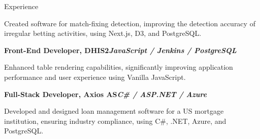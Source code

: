 \begin{rubric}{Experience}
\begin{compactitem}
\item Created software for match-fixing detection, improving the detection accuracy of irregular betting activities, using Next.js, D3, and PostgreSQL.
\vspace{-12pt}
\end{compactitem}
%
\entry*[2017 -- 2018]%
\textbf{Front-End Developer, DHIS2\hfill\textit{JavaScript / Jenkins / PostgreSQL}} \par
\begin{compactitem}
\item Enhanced table rendering capabilities, significantly improving application performance and user experience using Vanilla JavaScript.
\vspace{-12pt}
\end{compactitem}
%
\entry*[2014 -- 2016]%
\textbf{Full-Stack Developer, Axios AS\hfill\textit{C\# / ASP.NET / Azure}} \par
\begin{compactitem}
\item Developed and designed loan management software for a US mortgage institution, ensuring industry compliance, using C\#, .NET, Azure, and PostgreSQL.
\vspace{-12pt}
\end{compactitem}
%
\end{rubric}